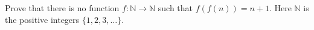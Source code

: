 Prove that there is no function $f : \mathbb{N} \to \mathbb{N}$ such that $f (f
(n)) = n + 1$. Here $\mathbb{N}$ is the positive integers $\{1, 2, 3, \dots\}$.
